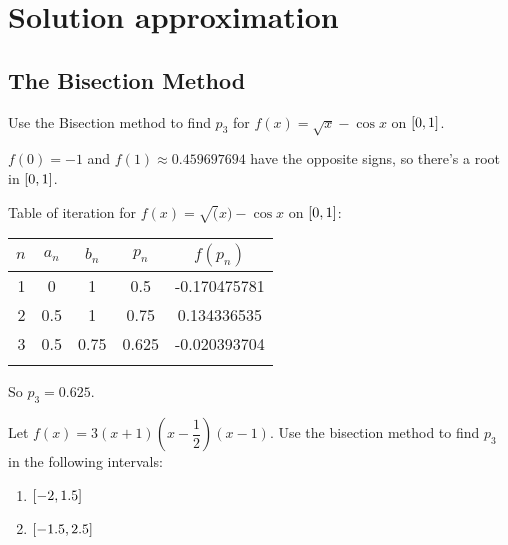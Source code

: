 \documentclass[../../Assignments.tex]{subfiles}
\begin{document}
\chapter{Solution approximation}

\section{The Bisection Method}

\begin{exercise}
    Use the Bisection method to find \(p_3\) for \(f(x) = \sqrt{x} - \cos{x}\) on \(\interval{0}{1}\).
\end{exercise}

\begin{solution}
    \(f(0) = -1\) and \(f(1) \approx \num{0.459697694}\) have the opposite
    signs, so there's a root in \(\interval{0}{1}\).

    Table of iteration for \(f(x) = \sqrt(x) - \cos{x}\) on \(\interval{0}{1}\):

    \begin{tabular}{r S[table-format=1.1] S[table-format=1.2] S[table-format=1.3] S[table-format=-1.9]}
        \\
        \toprule
        \(n\)  &  {\(a_n\)}  &  {\(b_n\)}  &  {\(p_n\)}  &  {\(f(p_n)\)}  \\
          &  0          &  1          &  0.5        &  -0.170475781  \\
            2  &  0.5        &  1          &  0.75       &   0.134336535  \\
            3  &  0.5        &  0.75       &  0.625      &  -0.020393704  \\
        \bottomrule
        \\
    \end{tabular}

    So \(p_3 = \num{0.625}\).
\end{solution}

\begin{exercise}
    Let \(f(x) = 3 (x + 1) (x - \dfrac{1}{2}) (x - 1)\). Use the bisection
    method to find \(p_3\) in the following intervals:

    \begin{enumerate}[label = (\alph*)]
        \item \(\interval{-2}{\num{1.5}}\)
        \item \(\interval{\num{-1.5}}{\num{2.5}}\)
    \end{enumerate}
\end{exercise}
\end{document}
